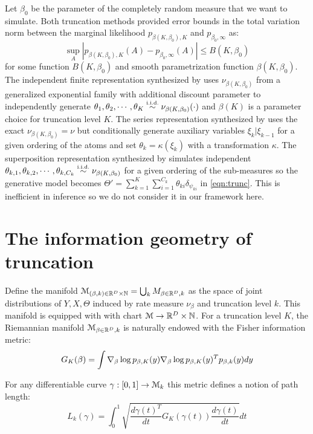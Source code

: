 \documentclass[letterpaper]{article}
\begin{document}
Let $\beta_0$ be the parameter of the completely random measure that we want to simulate. Both truncation methods provided error bounds in the total variation norm between the marginal likelihood $p_{\beta(K,\beta_0),K}$ and $p_{\beta_0,\infty}$ as:
\[
	\sup_A\left|p_{\beta(K,\beta_0),K}(A)-p_{\beta_0,\infty}(A)\right|\le B(K,\beta_0)
\]
for some function $B(K,\beta_0)$ and smooth parametrization function $\beta(K,\beta_0)$. The independent finite representation synthesized by \cite{nguyen20} uses $\nu_{\beta(K,\beta_0)}$ from a generalized exponential family \cite{broderick18} with additional discount parameter to independently generate $\theta_1,\theta_2,\cdots,\theta_K\distiid\nu_{\beta(K,\beta_0)}(\cdot)$ and $\beta(K)$ is a parameter choice for truncation level  $K$. The series representation synthesized by \cite{campbell19} uses the exact $\nu_{\beta(K,\beta_0)}=\nu$ but conditionally generate auxiliary variables $\xi_k|\xi_{k-1}$ for a given ordering of the atoms and set $\theta_k=\kappa(\xi_k)$ with a transformation $\kappa$. The superposition representation synthesized by \cite{campbell19} simulates independent $\theta_{k,1},\theta_{k,2},\cdots,\theta_{k,C_k}\distiid\nu_{\beta(K,\beta_0)}$ for a given ordering of the sub-measures so the generative model becomes $\Theta'=\sum_{k=1}^K\sum_{i=1}^{C_k}\theta_{ki}\delta_{\psi_{ki}}$ in \ref{eqn:trunc}. This is inefficient in inference \cite{zhu20,nguyen20} so we do not consider it in our framework here. 

\section{The information geometry of truncation}

Define the manifold $\mathcal{M}_{(\beta,k)\in\mathbb{R}^D\times\mathbb{N}}=\bigcup_k M_{\beta\in\mathbb{R}^D,k}$ as the space of  joint distributions of $Y,X,\Theta$ induced by rate measure $\nu_\beta$ and truncation level $k$. This manifold is equipped with with chart $\mathcal{M}\rightarrow\mathbb{R}^D\times\mathbb{N}$.  For a truncation level $K$, the Riemannian manifold $\mathcal{M}_{\beta\in\mathbb{R}^D,k}$ is naturally endowed with the Fisher information metric:
\[
	G_K(\beta)=\int\nabla_\beta\log p_{\beta,K}(y)\nabla_\beta\log p_{\beta,K}(y)^Tp_{\beta,k}(y)dy
\]

For any differentiable curve $\gamma:[0,1]\rightarrow\mathcal{M}_k$ this metric defines a notion of path length:
\[
	L_k(\gamma)=\int_0^1\sqrt{\frac{d\gamma(t)^T}{dt}G_K(\gamma(t))\frac{d\gamma(t)}{dt}}dt
\]



{
\small


}
\end{document}
